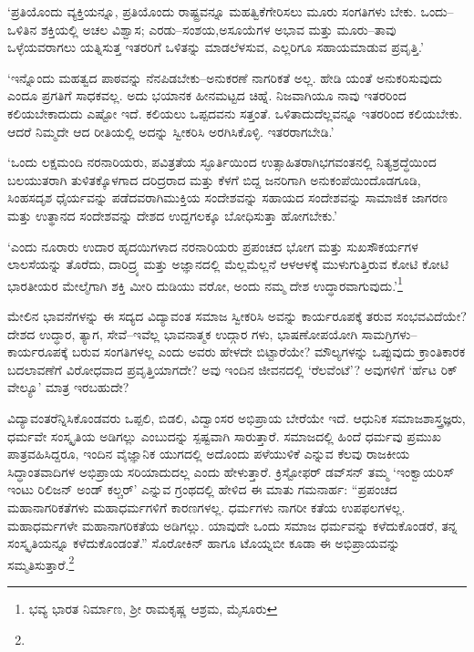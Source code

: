 ‘ಪ್ರತಿಯೊಂದು ವ್ಯಕ್ತಿಯನ್ನೂ, ಪ್ರತಿಯೊಂದು ರಾಷ್ಟ್ರವನ್ನೂ ಮಹತ್ವಿಕೆಗೇರಿಸಲು ಮೂರು ಸಂಗತಿಗಳು ಬೇಕು. ಒಂದು–ಒಳಿತಿನ ಶಕ್ತಿಯಲ್ಲಿ ಅಚಲ ವಿಶ್ವಾಸ; ಎರಡು–ಸಂಶಯ,\break ಅಸೂಯೆಗಳ ಅಭಾವ ಮತ್ತು ಮೂರು–ತಾವು ಒಳ್ಳೆಯವರಾಗಲು ಯತ್ನಿಸುತ್ತ ಇತರರಿಗೆ ಒಳಿತನ್ನು ಮಾಡಲೆಳಸುವ, ಎಲ್ಲರಿಗೂ ಸಹಾಯಮಾಡುವ ಪ್ರವೃತ್ತಿ.’

‘ಇನ್ನೊಂದು ಮಹತ್ವದ ಪಾಠವನ್ನು ನೆನಪಿಡಬೇಕು–ಅನುಕರಣೆ ನಾಗರಿಕತೆ ಅಲ್ಲ. ಹೇಡಿ ಯಂತೆ ಅನುಕರಿಸುವುದು ಎಂದೂ ಪ್ರಗತಿಗೆ ಸಾಧಕವಲ್ಲ. ಅದು ಭಯಾನಕ ಹೀನಮಟ್ಟದ ಚಿಹ್ನೆ. ನಿಜವಾಗಿಯೂ ನಾವು ಇತರರಿಂದ ಕಲಿಯಬೇಕಾದುದು ಎಷ್ಟೋ ಇದೆ. ಕಲಿಯಲು ಒಪ್ಪದವನು ಸತ್ತಂತೆ. ಒಳಿತಾದುದೆಲ್ಲವನ್ನೂ ಇತರರಿಂದ ಕಲಿಯಬೇಕು. ಆದರೆ ನಿಮ್ಮದೇ ಆದ ರೀತಿಯಲ್ಲಿ ಅದನ್ನು ಸ್ವೀಕರಿಸಿ ಅರಗಿಸಿಕೊಳ್ಳಿ. ಇತರರಾಗಬೇಡಿ.’

‘ಒಂದು ಲಕ್ಷಮಂದಿ ನರನಾರಿಯರು, ಪವಿತ್ರತೆಯ ಸ್ಫೂರ್ತಿಯಿಂದ ಉತ್ಸಾಹಿತರಾಗಿ\break ಭಗವಂತನಲ್ಲಿ ನಿತ್ಯಶ್ರದ್ಧೆಯಿಂದ ಬಲಯುತರಾಗಿ ತುಳಿತಕ್ಕೊಳಗಾದ ದರಿದ್ರರಾದ ಮತ್ತು ಕೆಳಗೆ ಬಿದ್ದ ಜನರಿಗಾಗಿ ಅನುಕಂಪೆಯಿಂದೊಡಗೂಡಿ, ಸಿಂಹಸದೃಶ ಧೈರ್ಯವನ್ನು ಪಡೆದವರಾಗಿ\break ಮುಕ್ತಿಯ ಸಂದೇಶವನ್ನು ಸಹಾಯದ ಸಂದೇಶವನ್ನು ಸಾಮಾಜಿಕ ಜಾಗರಣ ಮತ್ತು ಉತ್ಥಾನದ ಸಂದೇಶವನ್ನು ದೇಶದ ಉದ್ದಗಲಕ್ಕೂ ಬೋಧಿಸುತ್ತಾ ಹೋಗಬೇಕು.’

‘ಎಂದು ನೂರಾರು ಉದಾರ ಹೃದಯಿಗಳಾದ ನರನಾರಿಯರು ಪ್ರಪಂಚದ ಭೋಗ ಮತ್ತು ಸುಖಸೌಕರ್ಯಗಳ ಲಾಲಸೆಯನ್ನು ತೊರೆದು, ದಾರಿದ್ರ್ಯ ಮತ್ತು ಅಜ್ಞಾನದಲ್ಲಿ ಮೆಲ್ಲಮೆಲ್ಲನೆ ಆಳಆಳಕ್ಕೆ ಮುಳುಗುತ್ತಿರುವ ಕೋಟಿ ಕೋಟಿ ಭಾರತೀಯರ ಮೇಲ್ಮೆಗಾಗಿ ಶಕ್ತಿ ಮೀರಿ ದುಡಿಯು ವರೋ, ಅಂದು ನಮ್ಮ ದೇಶ ಉದ್ಧಾರವಾಗುವುದು.’\footnote{ಭವ್ಯ ಭಾರತ ನಿರ್ಮಾಣ, ಶ‍್ರೀ ರಾಮಕೃಷ್ಣ ಆಶ್ರಮ, ಮೈಸೂರು}

ಮೇಲಿನ ಭಾವನೆಗಳನ್ನು ಈ ಸದ್ಯದ ವಿದ್ಯಾವಂತ ಸಮಾಜ ಸ್ವೀಕರಿಸಿ ಅವನ್ನು ಕಾರ್ಯರೂಪಕ್ಕೆ ತರುವ ಸಂಭವವಿದೆಯೇ? ದೇಶದ ಉದ್ಧಾರ, ತ್ಯಾಗ, ಸೇವೆ–ಇವೆಲ್ಲ ಭಾವನಾತ್ಮಕ ಉದ್ಗಾರ ಗಳು, ಭಾಷಣೋಪಯೋಗಿ ಸಾಮಗ್ರಿಗಳು–ಕಾರ್ಯರೂಪಕ್ಕೆ ಬರುವ ಸಂಗತಿಗಳಲ್ಲ ಎಂದು ಅವರು ಹೇಳದೇ ಬಿಟ್ಟಾರೆಯೇ? ಮೌಲ್ಯಗಳನ್ನು ಒಪ್ಪುವುದು ಕ್ರಾಂತಿಕಾರಕ ಬದಲಾವಣೆಗೆ ವಿರೋಧವಾದ ಪ್ರವೃತ್ತಿಯಾಗದೇ? ಅವು ಇಂದಿನ ಜೀವನದಲ್ಲಿ ‘ರೆಲವೆಂಟೆ’? ಅವುಗಳಿಗೆ ‘ರ್ಹೆಟ ರಿಕ್ ವೇಲ್ಯೂ’ ಮಾತ್ರ ಇರಬಹುದೇ?

ವಿದ್ಯಾವಂತರೆನ್ನಿಸಿಕೊಂಡವರು ಒಪ್ಪಲಿ, ಬಿಡಲಿ, ವಿದ್ವಾಂಸರ ಅಭಿಪ್ರಾಯ ಬೇರೆಯೇ ಇದೆ. ಆಧುನಿಕ ಸಮಾಜಶಾಸ್ತ್ರಜ್ಞರು, ಧರ್ಮವೇ ಸಂಸ್ಕೃತಿಯ ಅಡಿಗಲ್ಲು ಎಂಬುದನ್ನು ಸ್ಪಷ್ಟವಾಗಿ ಸಾರುತ್ತಾರೆ. ಸಮಾಜದಲ್ಲಿ ಹಿಂದೆ ಧರ್ಮವು ಪ್ರಮುಖ ಪಾತ್ರವಹಿಸಿದ್ದರೂ, ಇಂದಿನ ವೈಜ್ಞಾನಿಕ ಯುಗದಲ್ಲಿ ಅದೊಂದು ಪಳೆಯುಳಿಕೆ ಎನ್ನುವ ಕೆಲವು ರಾಜಕೀಯ ಸಿದ್ಧಾಂತವಾದಿಗಳ ಅಭಿಪ್ರಾಯ ಸರಿಯಾದುದಲ್ಲ ಎಂದು ಹೇಳುತ್ತಾರೆ. ಕ್ರಿಸ್ಟೋಫರ್ ಡವ್​ಸನ್ ತಮ್ಮ ‘ಇಂಕ್ವಾಯರಿಸ್ ಇಂಟು ರಿಲಿಜನ್ ಅಂಡ್ ಕಲ್ಚರ್​’ ಎನ್ನುವ ಗ್ರಂಥದಲ್ಲಿ ಹೇಳಿದ ಈ ಮಾತು ಗಮನಾರ್ಹ: “ಪ್ರಪಂಚದ ಮಹಾನಾಗರಿಕತೆಗಳು ಮಹಾಧರ್ಮಗಳಿಗೆ ಕಾರಣಗಳಲ್ಲ. ಧರ್ಮಗಳು ನಾಗರೀ ಕತೆಯ ಉಪ\-ಫಲಗಳಲ್ಲ. ಮಹಾಧರ್ಮಗಳೇ ಮಹಾನಾಗರಿಕತೆಯ ಅಡಿಗಲ್ಲು. ಯಾವುದೇ ಒಂದು ಸಮಾಜ ಧರ್ಮವನ್ನು ಕಳೆದುಕೊಂಡರೆ, ತನ್ನ ಸಂಸ್ಕೃತಿಯನ್ನೂ ಕಳೆದುಕೊಂಡಂತೆ.” ಸೊರೋಕಿನ್ ಹಾಗೂ ಟೊಯ್ನಬೀ ಕೂಡಾ ಈ ಅಭಿಪ್ರಾಯವನ್ನು ಸಮ್ಮತಿಸುತ್ತಾರೆ.\footnote{}

